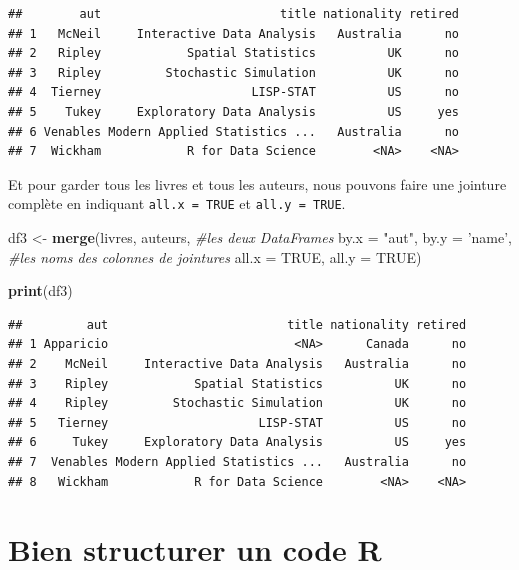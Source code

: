 \documentclass[
  11pt,
  french,
]{book}
\makeatletter
\newenvironment{Shaded}{\begin{snugshade}}{\end{snugshade}}
\newcommand{\CommentTok}[1]{\textcolor[rgb]{0.56,0.35,0.01}{\textit{#1}}}
\newcommand{\DataTypeTok}[1]{\textcolor[rgb]{0.13,0.29,0.53}{#1}}
\newcommand{\KeywordTok}[1]{\textcolor[rgb]{0.13,0.29,0.53}{\textbf{#1}}}
\newcommand{\NormalTok}[1]{#1}
\newcommand{\OtherTok}[1]{\textcolor[rgb]{0.56,0.35,0.01}{#1}}
\newcommand{\StringTok}[1]{\textcolor[rgb]{0.31,0.60,0.02}{#1}}
\newenvironment{kframe}{%
\medskip{}
\setlength{\fboxsep}{.8em}
 \def\at@end@of@kframe{}%
 \ifinner\ifhmode%
  \def\at@end@of@kframe{\end{minipage}}%
  \begin{minipage}{\columnwidth}%
 \fi\fi%
 \def\FrameCommand##1{\hskip\@totalleftmargin \hskip-\fboxsep
 \colorbox{shadecolor}{##1}\hskip-\fboxsep
     \hskip-\linewidth \hskip-\@totalleftmargin \hskip\columnwidth}%
 \MakeFramed {\advance\hsize-\width
   \@totalleftmargin\z@ \linewidth\hsize
   \@setminipage}}%
 {\par\unskip\endMakeFramed%
 \at@end@of@kframe}
\renewenvironment{Shaded}{\begin{kframe}}{\end{kframe}}
\makeatother
\begin{document}
\begin{verbatim}
##        aut                         title nationality retired
## 1   McNeil     Interactive Data Analysis   Australia      no
## 2   Ripley            Spatial Statistics          UK      no
## 3   Ripley         Stochastic Simulation          UK      no
## 4  Tierney                     LISP-STAT          US      no
## 5    Tukey     Exploratory Data Analysis          US     yes
## 6 Venables Modern Applied Statistics ...   Australia      no
## 7  Wickham            R for Data Science        <NA>    <NA>
\end{verbatim}

Et pour garder tous les livres et tous les auteurs, nous pouvons faire une jointure complète en indiquant \texttt{all.x\ =\ TRUE} et \texttt{all.y\ =\ TRUE}.

\begin{Shaded}
\begin{Highlighting}[]
\NormalTok{df3 <-}\StringTok{ }\KeywordTok{merge}\NormalTok{(livres, auteurs, }\CommentTok{#les deux DataFrames }
             \DataTypeTok{by.x =} \StringTok{"aut"}\NormalTok{, }\DataTypeTok{by.y =} \StringTok{'name'}\NormalTok{, }\CommentTok{#les noms des colonnes de jointures}
             \DataTypeTok{all.x =} \OtherTok{TRUE}\NormalTok{, }\DataTypeTok{all.y =} \OtherTok{TRUE}\NormalTok{)}

\KeywordTok{print}\NormalTok{(df3)}
\end{Highlighting}
\end{Shaded}

\begin{verbatim}
##         aut                         title nationality retired
## 1 Apparicio                          <NA>      Canada      no
## 2    McNeil     Interactive Data Analysis   Australia      no
## 3    Ripley            Spatial Statistics          UK      no
## 4    Ripley         Stochastic Simulation          UK      no
## 5   Tierney                     LISP-STAT          US      no
## 6     Tukey     Exploratory Data Analysis          US     yes
## 7  Venables Modern Applied Statistics ...   Australia      no
## 8   Wickham            R for Data Science        <NA>    <NA>
\end{verbatim}

\hypertarget{sect016}{%
\section{Bien structurer un code R}\label{sect016}}
\end{document}
